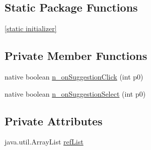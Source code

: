 \subsection*{Static Package Functions}
\begin{CompactItemize}
\item 
\hyperlink{classmono_1_1android_1_1support_1_1v7_1_1widget_1_1_search_view___on_suggestion_listener_implementor_9abf09aa8556ab0e038db6669580349f}{\mbox{[}static initializer\mbox{]}}
\end{CompactItemize}
\subsection*{Private Member Functions}
\begin{CompactItemize}
\item 
native boolean \hyperlink{classmono_1_1android_1_1support_1_1v7_1_1widget_1_1_search_view___on_suggestion_listener_implementor_9023621cdd7a9a33b9ef4346e7411645}{n\_\-onSuggestionClick} (int p0)
\item 
native boolean \hyperlink{classmono_1_1android_1_1support_1_1v7_1_1widget_1_1_search_view___on_suggestion_listener_implementor_de6e30aa618124672e673bfbfd86401c}{n\_\-onSuggestionSelect} (int p0)
\end{CompactItemize}
\subsection*{Private Attributes}
\begin{CompactItemize}
\item 
java.util.ArrayList \hyperlink{classmono_1_1android_1_1support_1_1v7_1_1widget_1_1_search_view___on_suggestion_listener_implementor_a2dbc37028b9d9d70be2d2a02ecf08ac}{refList}
\end{CompactItemize}


